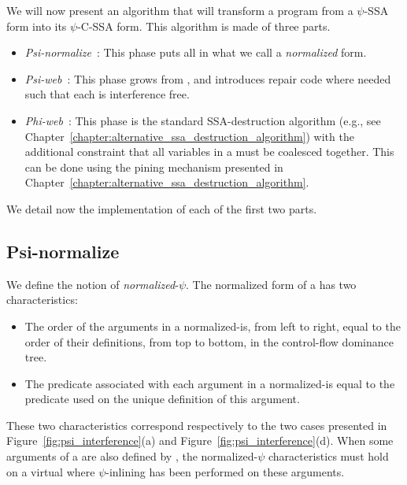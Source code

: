 We will now present an algorithm that will transform a program from a
$\psi$-SSA form into its $\psi$-C-SSA form. This algorithm is made of
three parts.

\begin{itemize}
\item \emph{Psi-normalize}~: This phase puts all \psifuns {}
in what we call a {\em normalized} form.
\item \emph{Psi-web}~: \index{\psiweb}This phase grows \psiwebs from \psifuns, and introduces repair code where needed such that each \psiweb is interference free.
\item \emph{Phi-web}~: This phase is the standard SSA-destruction algorithm (e.g., see Chapter~\ref{chapter:alternative_ssa_destruction_algorithm}) with the additional constraint that all variables in a \psiweb must be coalesced together. This can be done using the pining mechanism presented in Chapter~\ref{chapter:alternative_ssa_destruction_algorithm}. 
\end{itemize}

We detail now the implementation of each of the first two parts.

\subsection{Psi-normalize}

We define the notion of {\em normalized}-$\psi$. The normalized form of a \psifun has two characteristics:

\begin{itemize}
\item The order of the arguments in a normalized-\psifun is,
from left to right, equal to the order of their definitions, from top
to bottom, in the control-flow dominance tree.
\item The predicate associated with each argument in a
normalized-\psifun is equal to the predicate used on the
unique definition of this argument.
\end{itemize}

These two characteristics correspond respectively to the two cases
presented in Figure~\ref{fig:psi_interference}(a) and
Figure~\ref{fig:psi_interference}(d).
When some arguments of a \psifun are also defined by \psifuns, the {normalized}-$\psi$ characteristics must hold on a
virtual \psifun where $\psi$-inlining has been performed on
these arguments.

